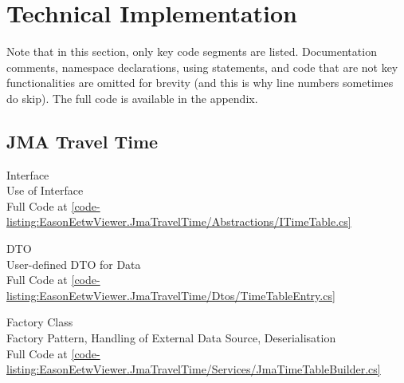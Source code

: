 \chapter{Technical Implementation}

Note that in this section, only key code segments are listed. Documentation comments, namespace declarations, using statements, and code that are not key functionalities are omitted for brevity (and this is why line numbers sometimes do skip). The full code is available in the appendix.

\clearpage
\section{JMA Travel Time}
\begin{normallisting}
    \caption[ Interface]{
         Interface \\
        Use of Interface \\
        Full Code at \autoref{code-listing:EasonEetwViewer.JmaTravelTime/Abstractions/ITimeTable.cs}}
\end{normallisting}

\begin{normallisting}
    \caption[ DTO]{
         DTO \\
        User-defined DTO for Data \\
        Full Code at \autoref{code-listing:EasonEetwViewer.JmaTravelTime/Dtos/TimeTableEntry.cs}}
\end{normallisting}

\begin{normallisting}
    \caption[ Factory Class]{
         Factory Class \\
        Factory Pattern, Handling of External Data Source, Deserialisation \\
        Full Code at \autoref{code-listing:EasonEetwViewer.JmaTravelTime/Services/JmaTimeTableBuilder.cs}}
\end{normallisting}

